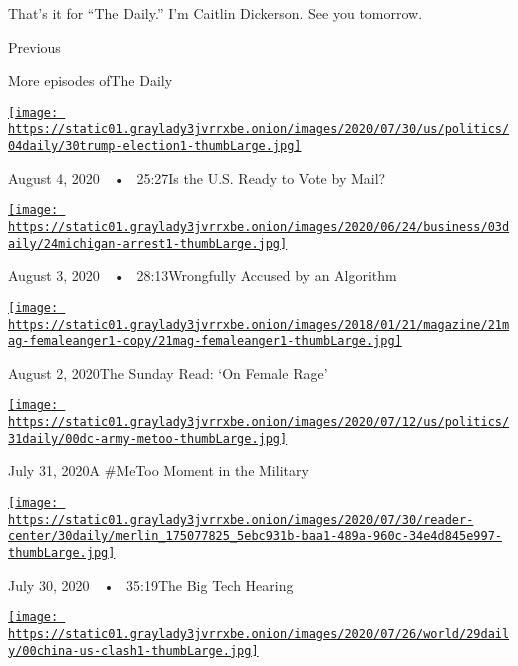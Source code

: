 That's it for ``The Daily.'' I'm Caitlin Dickerson. See you tomorrow.

Previous

More episodes ofThe Daily

\href{https://www.nytimes3xbfgragh.onion/2020/08/04/podcasts/the-daily/mail-in-voting-president-trump.html?action=click\&module=audio-series-bar\&region=header\&pgtype=Article}{\texttt{[image: https://static01.graylady3jvrrxbe.onion/images/2020/07/30/us/politics/04daily/30trump-election1-thumbLarge.jpg]}}

August 4, 2020~~•~ 25:27Is the U.S. Ready to Vote by Mail?

\href{https://www.nytimes3xbfgragh.onion/2020/08/03/podcasts/the-daily/algorithmic-justice-racism.html?action=click\&module=audio-series-bar\&region=header\&pgtype=Article}{\texttt{[image: https://static01.graylady3jvrrxbe.onion/images/2020/06/24/business/03daily/24michigan-arrest1-thumbLarge.jpg]}}

August 3, 2020~~•~ 28:13Wrongfully Accused by an Algorithm

\href{https://www.nytimes3xbfgragh.onion/2020/08/02/podcasts/the-daily/on-female-rage.html?action=click\&module=audio-series-bar\&region=header\&pgtype=Article}{\texttt{[image: https://static01.graylady3jvrrxbe.onion/images/2018/01/21/magazine/21mag-femaleanger1-copy/21mag-femaleanger1-thumbLarge.jpg]}}

August 2, 2020The Sunday Read: `On Female Rage'

\href{https://www.nytimes3xbfgragh.onion/2020/07/31/podcasts/the-daily/vanessa-guillen-military-metoo.html?action=click\&module=audio-series-bar\&region=header\&pgtype=Article}{\texttt{[image: https://static01.graylady3jvrrxbe.onion/images/2020/07/12/us/politics/31daily/00dc-army-metoo-thumbLarge.jpg]}}

July 31, 2020A \#MeToo Moment in the Military

\href{https://www.nytimes3xbfgragh.onion/2020/07/30/podcasts/the-daily/congress-facebook-amazon-google-apple.html?action=click\&module=audio-series-bar\&region=header\&pgtype=Article}{\texttt{[image: https://static01.graylady3jvrrxbe.onion/images/2020/07/30/reader-center/30daily/merlin\_175077825\_5ebc931b-baa1-489a-960c-34e4d845e997-thumbLarge.jpg]}}

July 30, 2020~~•~ 35:19The Big Tech Hearing

\href{https://www.nytimes3xbfgragh.onion/2020/07/29/podcasts/the-daily/china-trump-foreign-policy.html?action=click\&module=audio-series-bar\&region=header\&pgtype=Article}{\texttt{[image: https://static01.graylady3jvrrxbe.onion/images/2020/07/26/world/29daily/00china-us-clash1-thumbLarge.jpg]}}

